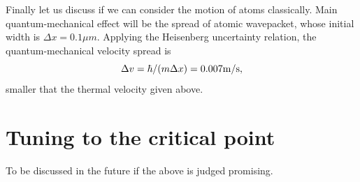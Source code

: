 \documentclass[a4paper,11pt]{article}
\newcommand{\beq}{\begin{equation}}
\newcommand{\eeq}{\end{equation}}
\theoremstyle{remark}
\theoremstyle{theorem}
\begin{document}
Finally let us discuss if we can consider the motion of atoms classically. Main quantum-mechanical effect will be the spread of atomic wavepacket, whose initial width is $\Delta x = 0.1\mu{ m}$. Applying the Heisenberg uncertainty relation, the quantum-mechanical velocity spread is
\beq
\Delta v =\hbar/(m \Delta x) = 0.007 {\rm m}/{\rm s},
\eeq
smaller that the thermal velocity given above. 

 \section{Tuning to the critical point}
 \label{sec:tuning}
 
 To be discussed in the future if the above is judged promising.
 




\end{document}
